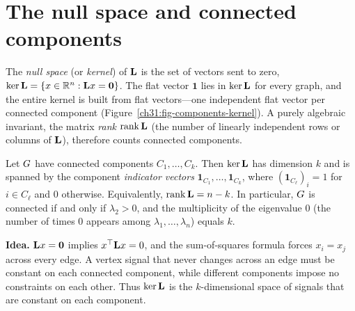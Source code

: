 \section{The null space and connected components}

The \emph{null space} (or \emph{kernel}) of $\mathbf{L}$ is the set of vectors sent to zero, $\ker\mathbf{L} = \{x\in\mathbb{R}^n : \mathbf{L} x = \mathbf{0}\}$. The flat vector $\mathbf{1}$ lies in $\ker\mathbf{L}$ for every graph, and the entire kernel is built from flat vectors---one independent flat vector per connected component (Figure~\ref{ch31:fig-components-kernel}). A purely algebraic invariant, the matrix \emph{rank} $\operatorname{rank}\mathbf{L}$ (the number of linearly independent rows or columns of $\mathbf{L}$), therefore counts connected components.

\begin{theorem}\label{ch31:thm-kernel}
Let $G$ have connected components $C_1,\dots,C_k$. Then $\ker\mathbf{L}$ has dimension $k$ and is spanned by the component \emph{indicator vectors} $\mathbf{1}_{C_1},\dots,\mathbf{1}_{C_k}$, where $(\mathbf{1}_{C_\ell})_i = 1$ for $i\in C_\ell$ and $0$ otherwise. Equivalently, $\operatorname{rank} \mathbf{L} = n - k$. In particular, $G$ is connected if and only if $\lambda_2 > 0$, and the multiplicity of the eigenvalue $0$ (the number of times $0$ appears among $\lambda_1,\dots,\lambda_n$) equals $k$.
\end{theorem}

\begin{whybox}
\textbf{Idea.} $\mathbf{L} x = \mathbf{0}$ implies $x^\top \mathbf{L} x = 0$, and the sum-of-squares formula forces $x_i = x_j$ across every edge. A vertex signal that never changes across an edge must be constant on each connected component, while different components impose no constraints on each other. Thus $\ker\mathbf{L}$ is the $k$-dimensional space of signals that are constant on each component.
\end{whybox}

